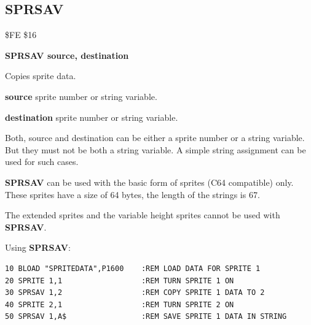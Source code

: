
\newpage
\subsection{SPRSAV}
\begin{description}[leftmargin=2cm,style=nextline]
\item [Token:] \$FE \$16
\item [Format:] {\bf SPRSAV source, destination}
\item [Usage:]  Copies sprite data.

                {\bf source} sprite number or string variable.

                {\bf destination} sprite number or string variable.

\item [Remarks:] Both, source and destination can be either
                a sprite number or a string variable.
                But they must not be both a string variable.
                A simple string assignment can be used for such
                cases.

                {\bf SPRSAV} can be used with the basic form of sprites
                (C64 compatible) only. These sprites have a size of 64 bytes,
                the length of the strings is 67.

                The extended sprites and the variable height sprites
                cannot be used with {\bf SPRSAV}.

\item [Example:] Using {\bf SPRSAV}:
\begin{tcolorbox}[colback=black,coltext=white]
\verbatimfont{\codefont}
\begin{verbatim}
10 BLOAD "SPRITEDATA",P1600    :REM LOAD DATA FOR SPRITE 1
20 SPRITE 1,1                  :REM TURN SPRITE 1 ON
30 SPRSAV 1,2                  :REM COPY SPRITE 1 DATA TO 2
40 SPRITE 2,1                  :REM TURN SPRITE 2 ON
50 SPRSAV 1,A$                 :REM SAVE SPRITE 1 DATA IN STRING
\end{verbatim}
\end{tcolorbox}
\end{description}


\newpage
